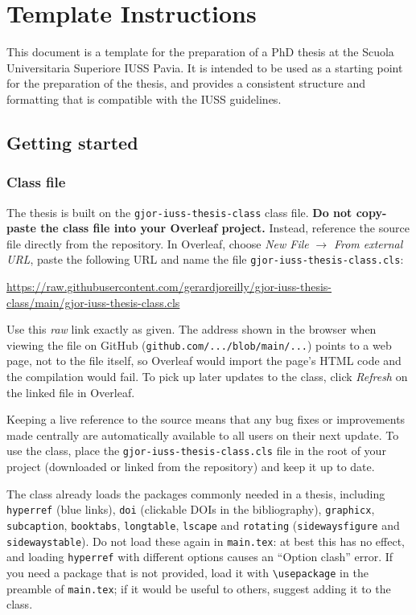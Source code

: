 \chapter{Template Instructions}

This document is a template for the preparation of a PhD thesis at the Scuola Universitaria Superiore IUSS Pavia. It is intended to be used as a starting point for the preparation of the thesis, and provides a consistent structure and formatting that is compatible with the IUSS guidelines.

\section{Getting started}

\subsection{Class file}

The thesis is built on the \texttt{gjor-iuss-thesis-class} class file. \textbf{Do not copy-paste the class file into your Overleaf project.} Instead, reference the source file directly from the repository. In Overleaf, choose \emph{New File} $\rightarrow$ \emph{From external URL}, paste the following URL and name the file \texttt{gjor-iuss-thesis-class.cls}:

\begin{center}
  \url{https://raw.githubusercontent.com/gerardjoreilly/gjor-iuss-thesis-class/main/gjor-iuss-thesis-class.cls}
\end{center}

\noindent Use this \emph{raw} link exactly as given. The address shown in the browser when viewing the file on GitHub (\texttt{github.com/.../blob/main/...}) points to a web page, not to the file itself, so Overleaf would import the page's HTML code and the compilation would fail. To pick up later updates to the class, click \emph{Refresh} on the linked file in Overleaf.

Keeping a live reference to the source means that any bug fixes or improvements made centrally are automatically available to all users on their next update. To use the class, place the \texttt{gjor-iuss-thesis-class.cls} file in the root of your project (downloaded or linked from the repository) and keep it up to date.

The class already loads the packages commonly needed in a thesis, including \texttt{hyperref} (blue links), \texttt{doi} (clickable DOIs in the bibliography), \texttt{graphicx}, \texttt{subcaption}, \texttt{booktabs}, \texttt{longtable}, \texttt{lscape} and \texttt{rotating} (\texttt{sidewaysfigure} and \texttt{sidewaystable}). Do not load these again in \texttt{main.tex}: at best this has no effect, and loading \texttt{hyperref} with different options causes an ``Option clash'' error. If you need a package that is not provided, load it with \verb|\usepackage| in the preamble of \texttt{main.tex}; if it would be useful to others, suggest adding it to the class.

